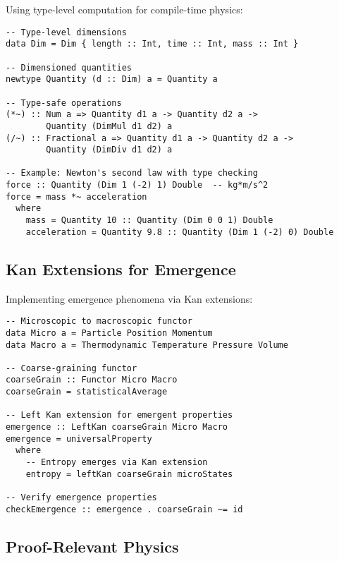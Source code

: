 Using type-level computation for compile-time physics:

\begin{example}
\begin{verbatim}
-- Type-level dimensions
data Dim = Dim { length :: Int, time :: Int, mass :: Int }

-- Dimensioned quantities
newtype Quantity (d :: Dim) a = Quantity a

-- Type-safe operations
(*~) :: Num a => Quantity d1 a -> Quantity d2 a -> 
        Quantity (DimMul d1 d2) a
(/~) :: Fractional a => Quantity d1 a -> Quantity d2 a -> 
        Quantity (DimDiv d1 d2) a

-- Example: Newton's second law with type checking
force :: Quantity (Dim 1 (-2) 1) Double  -- kg*m/s^2
force = mass *~ acceleration
  where
    mass = Quantity 10 :: Quantity (Dim 0 0 1) Double
    acceleration = Quantity 9.8 :: Quantity (Dim 1 (-2) 0) Double
\end{verbatim}
\end{example}

\subsection{Kan Extensions for Emergence}

Implementing emergence phenomena via Kan extensions:

\begin{example}
\begin{verbatim}
-- Microscopic to macroscopic functor
data Micro a = Particle Position Momentum
data Macro a = Thermodynamic Temperature Pressure Volume

-- Coarse-graining functor
coarseGrain :: Functor Micro Macro
coarseGrain = statisticalAverage

-- Left Kan extension for emergent properties
emergence :: LeftKan coarseGrain Micro Macro
emergence = universalProperty
  where
    -- Entropy emerges via Kan extension
    entropy = leftKan coarseGrain microStates
    
-- Verify emergence properties
checkEmergence :: emergence . coarseGrain ~= id
\end{verbatim}
\end{example}

\subsection{Proof-Relevant Physics}

